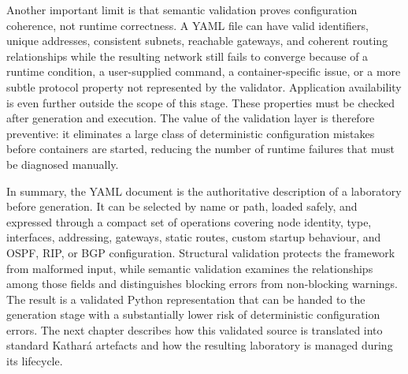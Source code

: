 Another important limit is that semantic validation proves configuration
coherence, not runtime correctness. A YAML file can have valid identifiers,
unique addresses, consistent subnets, reachable gateways, and coherent routing
relationships while the resulting network still fails to converge because of
a runtime condition, a user-supplied command, a container-specific issue, or a
more subtle protocol property not represented by the validator. Application
availability is even further outside the scope of this stage. These properties
must be checked after generation and execution. The value of the validation
layer is therefore preventive: it eliminates a large class of deterministic
configuration mistakes before containers are started, reducing the number of
runtime failures that must be diagnosed manually.

In summary, the YAML document is the authoritative description of a laboratory
before generation. It can be selected by name or path, loaded safely, and
expressed through a compact set of operations covering node identity, type,
interfaces, addressing, gateways, static routes, custom startup behaviour, and
OSPF, RIP, or BGP configuration. Structural validation protects the framework
from malformed input, while semantic validation examines the relationships
among those fields and distinguishes blocking errors from non-blocking
warnings. The result is a validated Python representation that can be handed
to the generation stage with a substantially lower risk of deterministic
configuration errors. The next chapter describes how this validated source is
translated into standard Kathar\'a artefacts and how the resulting laboratory
is managed during its lifecycle.
